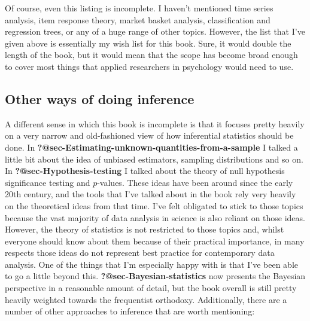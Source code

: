 \documentclass[
  a4paper,
]{book}
\begin{document}
Of course, even this listing is incomplete. I haven't mentioned time
series analysis, item response theory, market basket analysis,
classification and regression trees, or any of a huge range of other
topics. However, the list that I've given above is essentially my wish
list for this book. Sure, it would double the length of the book, but it
would mean that the scope has become broad enough to cover most things
that applied researchers in psychology would need to use.

\hypertarget{other-ways-of-doing-inference}{%
\subsection*{Other ways of doing
inference}\label{other-ways-of-doing-inference}}

A different sense in which this book is incomplete is that it focuses
pretty heavily on a very narrow and old-fashioned view of how
inferential statistics should be done. In
\textbf{?@sec-Estimating-unknown-quantities-from-a-sample} I talked a
little bit about the idea of unbiased estimators, sampling distributions
and so on. In \textbf{?@sec-Hypothesis-testing} I talked about the
theory of null hypothesis significance testing and \(p\)-values. These
ideas have been around since the early 20th century, and the tools that
I've talked about in the book rely very heavily on the theoretical ideas
from that time. I've felt obligated to stick to those topics because the
vast majority of data analysis in science is also reliant on those
ideas. However, the theory of statistics is not restricted to those
topics and, whilst everyone should know about them because of their
practical importance, in many respects those ideas do not represent best
practice for contemporary data analysis. One of the things that I'm
especially happy with is that I've been able to go a little beyond this.
\textbf{?@sec-Bayesian-statistics} now presents the Bayesian perspective
in a reasonable amount of detail, but the book overall is still pretty
heavily weighted towards the frequentist orthodoxy. Additionally, there
are a number of other approaches to inference that are worth mentioning:
\end{document}

